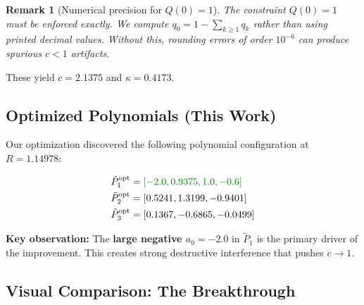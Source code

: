 \documentclass[11pt]{article}
\newtheorem{remark}{Remark}
\begin{document}
\begin{remark}[Numerical precision for $Q(0) = 1$]
\label{rem:Q-precision}
The constraint $Q(0) = 1$ must be enforced exactly. We compute $q_0 = 1 - \sum_{k \geq 1} q_k$ rather than using printed decimal values. Without this, rounding errors of order $10^{-6}$ can produce spurious $c < 1$ artifacts.
\end{remark}

These yield $c = 2.1375$ and $\kappa = 0.4173$.

\subsection{Optimized Polynomials (This Work)}

Our optimization discovered the following polynomial configuration at $R = 1.14978$:

\begin{align}
\tilde{P}_1^{\text{opt}} &= \textcolor{improvement}{[-2.0, 0.9375, 1.0, -0.6]} \\
\tilde{P}_2^{\text{opt}} &= [0.5241, 1.3199, -0.9401] \\
\tilde{P}_3^{\text{opt}} &= [0.1367, -0.6865, -0.0499]
\end{align}

\textbf{Key observation:} The \textcolor{improvement}{\textbf{large negative $a_0 = -2.0$}} in $\tilde{P}_1$ is the primary driver of the improvement. This creates strong destructive interference that pushes $c \to 1$.

\subsection{Visual Comparison: The Breakthrough}
\end{document}
